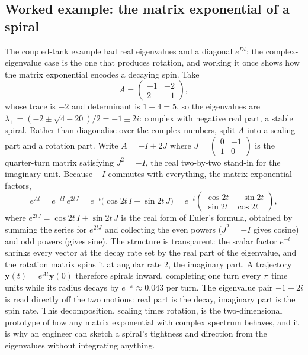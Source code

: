 \subsection{Worked example: the matrix exponential of a spiral}

The coupled-tank example had real eigenvalues and a diagonal $e^{Dt}$;
the complex-eigenvalue case is the one that produces rotation, and
working it once shows how the matrix exponential encodes a decaying spin.
Take
\[
A = \begin{pmatrix} -1 & -2 \\ 2 & -1 \end{pmatrix},
\]
whose trace is $-2$ and determinant is $1 + 4 = 5$, so the eigenvalues
are $\lambda_{\pm} = (-2 \pm \sqrt{4 - 20})/2 = -1 \pm 2i$: complex with
negative real part, a stable spiral. Rather than diagonalise over the
complex numbers, split $A$ into a scaling part and a rotation part. Write
$A = -I + 2J$ where $J = \begin{pmatrix} 0 & -1 \\ 1 & 0 \end{pmatrix}$
is the quarter-turn matrix satisfying $J^{2} = -I$, the real
two-by-two stand-in for the imaginary unit. Because $-I$ commutes with
everything, the matrix exponential factors,
\[
e^{At} = e^{-t I}\, e^{2t J} = e^{-t}\bigl(\cos 2t\, I + \sin 2t\, J\bigr)
= e^{-t}\begin{pmatrix} \cos 2t & -\sin 2t \\ \sin 2t & \cos 2t
\end{pmatrix},
\]
where $e^{2tJ} = \cos 2t\, I + \sin 2t\, J$ is the real form of Euler's
formula, obtained by summing the series for $e^{2tJ}$ and collecting the
even powers ($J^{2} = -I$ gives cosine) and odd powers (gives sine). The
structure is transparent: the scalar factor $e^{-t}$ shrinks every vector
at the decay rate set by the real part of the eigenvalue, and the
rotation matrix spins it at angular rate $2$, the imaginary part. A
trajectory $\mathbf{y}(t) = e^{At}\mathbf{y}(0)$ therefore spirals inward,
completing one turn every $\pi$ time units while its radius decays by
$e^{-\pi} \approx 0.043$ per turn. The eigenvalue pair $-1 \pm 2i$ is read
directly off the two motions: real part is the decay, imaginary part is
the spin rate. This decomposition, scaling times rotation, is the
two-dimensional prototype of how any matrix exponential with complex
spectrum behaves, and it is why an engineer can sketch a spiral's tightness
and direction from the eigenvalues without integrating anything.

